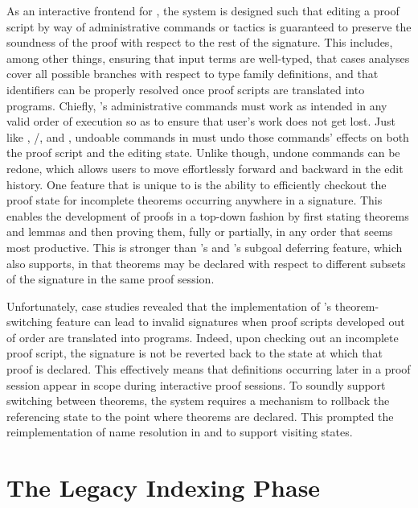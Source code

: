 As an interactive frontend for \Beluga, the \Harpoon system is designed such that editing a proof script by way of administrative commands or tactics is guaranteed to preserve the soundness of the proof with respect to the rest of the \Beluga signature.
This includes, among other things, ensuring that input terms are well-typed, that cases analyses cover all possible branches with respect to type family definitions, and that identifiers can be properly resolved once proof scripts are translated into programs.
Chiefly, \Harpoon's administrative commands must work as intended in any valid order of execution so as to ensure that user's work does not get lost.
Just like \Abella, \Isabelle/\Isar, \Coq and \Agda, undoable commands in \Harpoon must undo those commands' effects on both the proof script and the editing state.
Unlike \Abella though, undone commands can be redone, which allows users to move effortlessly forward and backward in the edit history.
One feature that is unique to \Harpoon is the ability to efficiently checkout the proof state for incomplete theorems occurring anywhere in a \Beluga signature.
This enables the development of proofs in a top-down fashion by first stating theorems and lemmas and then proving them, fully or partially, in any order that seems most productive.
This is stronger than \Abella's and \Coq's subgoal deferring feature, which \Harpoon also supports, in that theorems may be declared with respect to different subsets of the signature in the same proof session.

Unfortunately, case studies revealed that the implementation of \Harpoon's theorem-switching feature can lead to invalid \Beluga signatures when proof scripts developed out of order are translated into programs.
Indeed, upon checking out an incomplete proof script, the signature is not be reverted back to the state at which that proof is declared.
This effectively means that definitions occurring later in a proof session appear in scope during interactive proof sessions.
To soundly support switching between theorems, the \Beluga system requires a mechanism to rollback the referencing state to the point where theorems are declared.
This prompted the reimplementation of name resolution in \Beluga and \Harpoon to support visiting states.

\section{The Legacy Indexing Phase}


